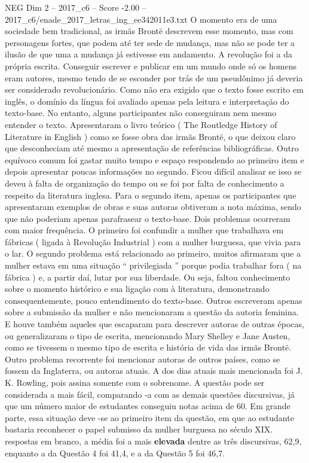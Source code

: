 \begin{textsample}{NEG Dim 2 – 2017\_c6 – Score -2.00 – 2017\_c6/enade\_2017\_letras\_ing\_ee342011e3.txt}
O momento era de uma sociedade bem tradicional, as irmãs Brontë descrevem esse momento, mas com personagens fortes, que podem até ter sede de mudança, mas não se pode ter a ilusão de que uma a mudança já estivesse em andamento.
A revolução foi a da própria escrita.
Conseguir escrever e publicar em um mundo onde só os homens eram autores, mesmo tendo de se esconder por trás de um pseudônimo já deveria ser considerado revolucionário.
Como não era exigido que o texto fosse escrito em inglês, o domínio da língua foi avaliado apenas pela leitura e interpretação do texto-base.
No entanto, alguns participantes não conseguiram nem mesmo entender o texto.
Apresentaram o livro teórico ( The Routledge History of Literature in English ) como se fosse obra das irmãs Brontë, o que deixou claro que desconheciam até mesmo a apresentação de referências bibliográficas.
Outro equívoco comum foi gastar muito tempo e espaço respondendo ao primeiro item e depois apresentar poucas informações no segundo.
Ficou difícil analisar se isso se deveu à falta de organização do tempo ou se foi por falta de conhecimento a respeito da literatura inglesa.
Para o segundo item, apenas os participantes que apresentaram exemplos de obras e suas autoras obtiveram a nota máxima, sendo que não poderiam apenas parafrasear o texto-base.
Dois problemas ocorreram com maior frequência.
O primeiro foi confundir a mulher que trabalhava em fábricas ( ligada à Revolução Industrial ) com a mulher burguesa, que vivia para o lar.
O segundo problema está relacionado ao primeiro, muitos afirmaram que a mulher estava em uma situação “ privilegiada ” porque podia trabalhar fora ( na fábrica ) e, a partir daí, lutar por sua liberdade.
Ou seja, faltou conhecimento sobre o momento histórico e sua ligação com à literatura, demonstrando consequentemente, pouco entendimento do texto-base.
Outros escreveram apenas sobre a submissão da mulher e não mencionaram a questão da autoria feminina.
E houve também aqueles que escaparam para descrever autoras de outras épocas, ou generalizaram o tipo de escrita, mencionando Mary Shelley e Jane Austen, como se tivessem o mesmo tipo de escrita e história de vida das irmãs Brontë.
Outro problema recorrente foi mencionar autoras de outros países, como se fossem da Inglaterra, ou autoras atuais.
A dos dias atuais mais mencionada foi J.
K.
Rowling, pois assina somente com o sobrenome.
A questão pode ser considerada a mais fácil, comparando -a com as demais questões discursivas, já que um número maior de estudantes conseguiu notas acima de 60.
Em grande parte, essa situação deve -se ao primeiro item da questão, em que ao estudante bastaria reconhecer o papel submisso da mulher burguesa no século XIX. respostas em branco, a média foi a mais \textbf{elevada} dentre as três discursivas, 62,9, enquanto a da Questão 4 foi 41,4, e a da Questão 5 foi 46,7.

\end{textsample}
